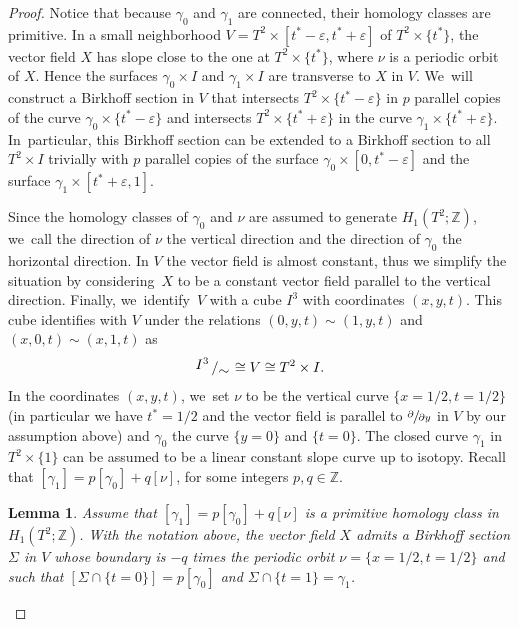 \documentclass[11pt]{article}
\newcommand{\spp}[2]{\sfrac{\partial#1}{\partial#2}}
\newtheorem{lemma}[theorem]{Lemma}
\theoremstyle{definition}
\newcommand{\bigslant}[2]{{\raisebox{.2em}{$#1$}\left/\raisebox{-.2em}{$#2$}\right.}}
\begin{document}
\begin{proof}
{Notice that because $\gamma_0$ and $\gamma_1$ are connected, their homology classes are primitive.} In a small neighborhood $V=T^2\times [t^*-\varepsilon,t^*+\varepsilon]$ of $T^2 \times \{t^*\}$, the vector field $X$ has slope close to the one at $T^2\times \{t^*
\}$, where $\nu$ is a periodic orbit of $X$. Hence the surfaces $\gamma_0\times I$ and $\gamma_1 \times I$ are transverse to $X$ in $V$. We~will construct a Birkhoff section in $V$ that intersects $T^2\times\{t^*-\varepsilon\}$ in $p$ parallel copies of the curve $\gamma_0 \times \{t^*-\varepsilon\}$ and intersects $T^2\times\{t^*+\varepsilon\}$ in the curve $\gamma_1\times \{t^*+\varepsilon\}$. In~particular, this Birkhoff section can be extended to a Birkhoff section to all $T^2\times I$ trivially with $p$ parallel copies of the surface $\gamma_0\times [0,t^*-\varepsilon]$ and the surface $\gamma_1 \times [t^*+\varepsilon,1]$.

{Since the homology classes of $\gamma_0$ and $\nu$ are assumed to generate $H_1(T^2;\mathbb{Z})$, we~call the direction of $\nu$ the vertical direction and the direction of $\gamma_0$ the horizontal direction.} In $V$ the vector field is almost constant, thus we simplify the situation by considering~$X$ to be a constant vector field parallel to the vertical direction. Finally, we~iden\-ti\-fy~$V$ with a cube $I^3$ with coordinates $(x,y,t)$. This cube identifies with $V$ under the relations $(0,y,t) \sim (1,y,t)$ and $(x,0,t) \sim (x,1,t)$ as
\[
\bigslant{I^3}{\sim} \cong V\cong T^2\times I.
\]
{In the coordinates $(x,y,t)$, we~set $\nu$ to be the vertical} curve $\{x=1/2,t=1/2\}$ (in particular we have $t^*=1/2$ and the vector field is parallel to $\spp{}{y}$ in $V$ by our assumption above) and $\gamma_0$ the curve $\{y=0\}$ and $\{t=0\}$.
The closed curve $\gamma_1$ in $T^2\times \{1\}$ can be assumed to be a linear constant slope curve up to isotopy. Recall that
$[\gamma_1]=p[\gamma_0]+ q[\nu]$,
for some integers $p,q\in \mathbb{Z}$.

\begin{lemma}\label{lem:Birk}
Assume that $[\gamma_1]=p [\gamma_0] + q [\nu]$ is a primitive homology class in $H_1(T^2;\mathbb{Z})$. With the notation above, the vector field $X$ admits a Birkhoff section $\Sigma$ in $V$ whose boundary is $-q$ times the periodic orbit $\nu=\{x=1/2, t=1/2\}$ and such that $[\Sigma\cap \{t=0\}] =p [\gamma_0]$ and $\Sigma \cap \{t=1\}=\gamma_1$.
\end{lemma}


\end{proof}
\end{document}
